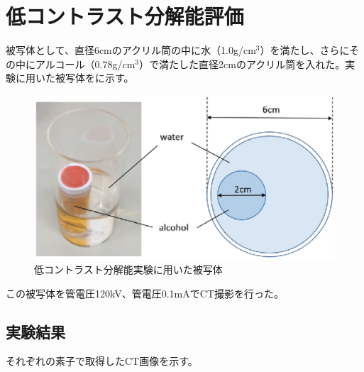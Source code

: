 \section{低コントラスト分解能評価}
被写体として、直径6cmのアクリル筒の中に水（1.0g/cm$^3$）を満たし、さらにその中にアルコール（0.78g/cm$^3$）で満たした直径2cmのアクリル筒を入れた。実験に用いた被写体をに示す。

\begin{figure}[H]
 \begin{center}
 \includegraphics[width=14cm]{image2/chapter5/phantom1.eps}
 \end{center}
 \caption{低コントラスト分解能実験に用いた被写体}
 \label{fig:phantom1}
\end{figure}

この被写体を管電圧120kV、管電圧0.1mAでCT撮影を行った。

\subsection{実験結果}

それぞれの素子で取得したCT画像を示す。


